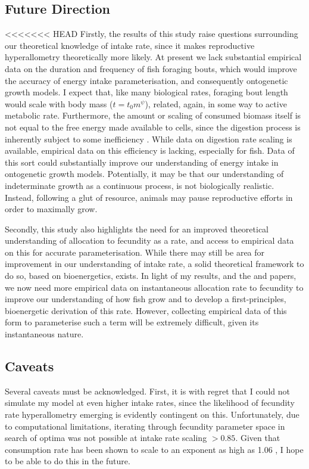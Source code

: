 \documentclass[a4paper]{article} %
\begin{document}
\begin{center}
\begin{minipage}{\linewidth}
\subsection{Future Direction}
<<<<<<< HEAD
Firstly, the results of this study raise questions surrounding our theoretical knowledge of intake rate, since it makes reproductive hyperallometry theoretically more likely. At present we lack substantial empirical data on the duration and frequency of fish foraging bouts, which would improve the accuracy of energy intake parameterisation, and consequently ontogenetic growth models.  I expect that, like many biological rates, foraging bout length would scale with body mass ($t = t_{0}m^{\psi}$), related, again, in some way to active metabolic rate. Furthermore, the amount or scaling of consumed biomass itself is not equal to the free energy made available to cells, since the digestion process is inherently subject to some inefficiency \autocite{VanGemert2019}. While data on digestion rate scaling is available, empirical data on this efficiency is lacking, especially for fish. Data of this sort could substantially improve our understanding of energy intake in ontogenetic growth models. Potentially, it may be that our understanding of indeterminate growth as a continuous process, is not biologically realistic. Instead, following a glut of resource, animals may pause reproductive efforts in order to maximally grow.

Secondly, this study also highlights the need for an improved theoretical understanding of allocation to fecundity as a rate, and access to empirical data on this for accurate parameterisation. While there may still be area for improvement in our understanding of intake rate, a solid theoretical framework to do so, based on bioenergetics, exists. In light of my results, and the \textcite{Barneche2018-reproductive_output} and \textcite{Marshall2019b} papers, we now need more empirical data on instantaneous allocation rate to fecundity to improve our understanding of how fish grow and to develop a first-principles, bioenergetic derivation of this rate. However, collecting empirical data of this form to parameterise such a term will be extremely difficult, given its instantaneous nature.

\subsection{Caveats}
Several caveats must be acknowledged. First, it is with regret that I could not simulate my model at even higher intake rates, since the likelihood of fecundity rate hyperallometry emerging is evidently contingent on this. Unfortunately, due to computational limitations, iterating through fecundity parameter space in search of optima was not possible at intake rate scaling $> 0.85$. Given that consumption rate has been shown to scale to an exponent as high as 1.06 \autocite{Pawar2012}, I hope to be able to do this in the future.


\end{minipage}
\end{center}
\end{document}
